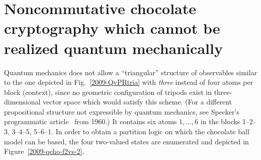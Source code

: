 \documentclass[%
 preprint,
 showpacs,
 showkeys,
 preprintnumbers,
 amsmath,amssymb,
 aps,
 pra,
  longbibliography,
 ]{revtex4-1}
\begin{document}
\section{Noncommutative chocolate cryptography which cannot be realized quantum mechanically}

Quantum mechanics does not allow a ``triangular'' structure of observables similar to the one depicted in
Fig.~\ref{2009-QvPRtria} with {\em three} instead of four atoms per block (context),
since no geometric configuration of tripods exist in three-dimensional vector space which would satisfy this scheme.
(For a different propositional structure not expressible by quantum mechanics, see Specker's programmatic article~\cite{specker-60} from 1960.)
It contains six atoms $1,\ldots ,6$ in the blocks 1--2--3, 3--4--5, 5--6--1.
In order to obtain a partition logic on which the chocolate ball model can be based, the four two-valued states
are enumerated and depicted in Figure~\ref{2009-qcho-f2vs-2}.
\end{document}
